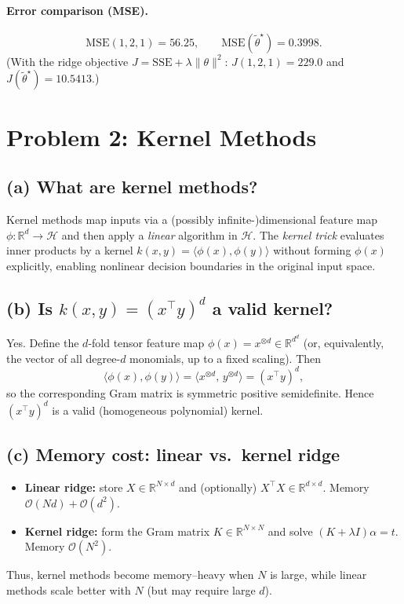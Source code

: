 \documentclass[11pt]{article}
\begin{document}
\paragraph{Error comparison (MSE).}
\[
\mathrm{MSE}(1,2,1)=56.25,\qquad
\mathrm{MSE}(\tilde\theta^\star)=0.3998.
\]
(With the ridge objective $J=\mathrm{SSE}+\lambda\|\theta\|^2$: $J(1,2,1)=229.0$ and $J(\tilde\theta^\star)=10.5413$.)
\section{Problem 2: Kernel Methods}

\subsection*{(a) What are kernel methods?}
Kernel methods map inputs via a (possibly infinite\!-)dimensional feature map $\phi:\mathbb{R}^d\!\to\!\mathcal{H}$ and then apply a \emph{linear} algorithm in $\mathcal{H}$. The \emph{kernel trick} evaluates inner products by a kernel
$k(x,y)=\langle\phi(x),\phi(y)\rangle$
without forming $\phi(x)$ explicitly, enabling nonlinear decision boundaries in the original input space.

\subsection*{(b) Is $k(x,y)=(x^\top y)^d$ a valid kernel?}
Yes. Define the $d$-fold tensor feature map $\phi(x)=x^{\otimes d}\in\mathbb{R}^{d^d}$ (or, equivalently, the vector of all degree-$d$ monomials, up to a fixed scaling). Then
\[
\langle \phi(x),\phi(y)\rangle
=\langle x^{\otimes d},\,y^{\otimes d}\rangle
=(x^\top y)^d,
\]
so the corresponding Gram matrix is symmetric positive semidefinite. Hence $(x^\top y)^d$ is a valid (homogeneous polynomial) kernel.

\subsection*{(c) Memory cost: linear vs.\ kernel ridge}
\begin{itemize}
  \item \textbf{Linear ridge:} store $X\in\mathbb{R}^{N\times d}$ and (optionally) $X^\top X\in\mathbb{R}^{d\times d}$.
        Memory $\mathcal{O}(Nd)+\mathcal{O}(d^2)$.
  \item \textbf{Kernel ridge:} form the Gram matrix $K\in\mathbb{R}^{N\times N}$ and solve $(K+\lambda I)\alpha=t$.
        Memory $\mathcal{O}(N^2)$.
\end{itemize}
Thus, kernel methods become memory–heavy when $N$ is large, while linear methods scale better with $N$ (but may require large $d$).
\end{document}
